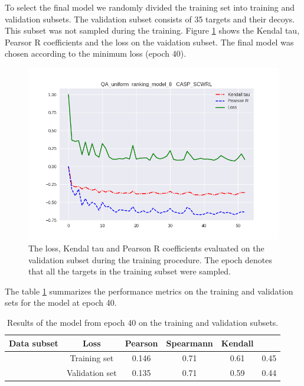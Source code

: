 \documentclass[a4paper,10pt]{article}
\begin{document}
To select the final model we randomly divided the training set into training and validation subsets. The validation subset consists of 
35 targets and their decoys. This subset was not sampled during the training. 
Figure \ref{Fig:TrainingLoss} shows the Kendal tau, Pearsor R coefficients and the loss on the vaidation subset. 
The final model was chosen according to the minimum loss (epoch 40).
\begin{figure}[H]
    \centering
    \includegraphics[width=\linewidth]{Fig/kendall_validation.png}
    \caption{The loss, Kendal tau and Pearson R coefficients evaluated on the validation subset during the training procedure. The epoch 
    denotes that all the targets in the training subset were sampled.}
    \label{Fig:TrainingLoss}
\end{figure}

The table \ref{Tbl:TrainingResults} summarizes the performance metrics on the training and validation sets for the model at epoch 40.

\begin{table}[H]
\begin{center}
\begin{tabular}{ c | c | c | c | c | c }
    Data subset & Loss & Pearson & Spearmann & Kendall \\
    \hline
    &Training set     &0.146 &0.71 &0.61 &0.45 \\
    &Validation set   &0.135 &0.71 &0.59 &0.44 \\ \hline

\end{tabular}
  \caption {Results of the model from epoch 40 on the training and validation subsets.}
    \label{Tbl:TrainingResults}
\end{center}
\end{table}
\end{document}
